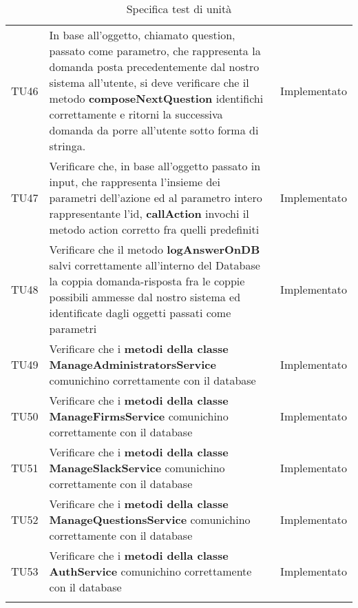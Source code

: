 \documentclass[../PianoDiQualifica_v3.0.0.tex]{subfiles}
\begin{document}
\begin{longtable}[c] { >{\centering\arraybackslash}p{2cm} p{9cm} >{\centering\arraybackslash}p{4cm}}
			\addlinespace[0.3em]
			\midrule
			\addlinespace[0.3em]
			TU46 & In base all'oggetto, chiamato question, passato come parametro, che rappresenta la domanda posta precedentemente dal nostro sistema all'utente, si deve verificare che il metodo \textbf{composeNextQuestion} identifichi correttamente e ritorni la successiva domanda da porre all'utente sotto forma di stringa. & Implementato \\
			\addlinespace[0.3em]
			\midrule
			\addlinespace[0.3em]
			TU47 & Verificare che, in base all'oggetto passato in input, che rappresenta l'insieme dei parametri dell'azione ed al parametro intero rappresentante l'id, \textbf{callAction} invochi il metodo action corretto fra quelli predefiniti & Implementato \\
			\addlinespace[0.3em]
			\midrule
			\addlinespace[0.3em]
			TU48 & Verificare che il metodo \textbf{logAnswerOnDB} salvi correttamente all'interno del Database la coppia domanda-risposta fra le coppie possibili ammesse dal nostro sistema ed identificate dagli oggetti passati come parametri & Implementato \\
			\addlinespace[0.3em]
			\midrule
			\addlinespace[0.3em]
			TU49 & Verificare che i \textbf{metodi della classe ManageAdministratorsService} comunichino correttamente con il database & Implementato \\
			\addlinespace[0.3em]
			\midrule
			\addlinespace[0.3em]
			TU50 & Verificare che i \textbf{metodi della classe ManageFirmsService} comunichino correttamente con il database & Implementato \\
			\addlinespace[0.3em]
			\midrule
			\addlinespace[0.3em]
			TU51 & Verificare che i \textbf{metodi della classe ManageSlackService} comunichino correttamente con il database & Implementato \\
			\addlinespace[0.3em]
			\midrule
			\addlinespace[0.3em]
			TU52 & Verificare che i \textbf{metodi della classe ManageQuestionsService} comunichino correttamente con il database & Implementato \\
			\addlinespace[0.3em]
			\midrule
			\addlinespace[0.3em]
			TU53 & Verificare che i \textbf{metodi della classe AuthService} comunichino correttamente con il database & Implementato \\
		\bottomrule
		\caption{Specifica test di unità}
	\end{longtable}

	\newpage
\end{document}
